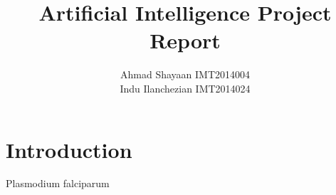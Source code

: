 \documentclass{article}
\title{Artificial Intelligence  Project Report}
\author{Ahmad Shayaan IMT2014004 \\ Indu Ilanchezian IMT2014024}
\begin{document}
	\maketitle
	
	\section{Introduction}
	Plasmodium falciparum
\end{document}
